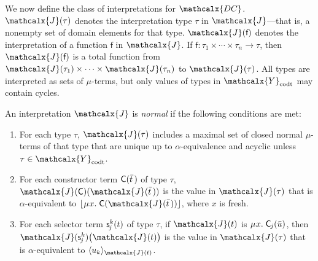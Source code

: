 \documentclass[smallcondensed,draft]{svjour3}
\newcommand\MU{\vvthinspace\mu\vvthinspace}
\newcommand\afterDot{\;} %
\newcommand\const[1]{\textsf{#1}}
\renewcommand{\vec}[1]{\bar #1}
\newcommand{\expand}[2]{\langle \smash{#2} \rangle_{#1}}
\newcommand{\interp}[2]{#1(#2)}
\newcommand{\J}{\mathcalx{J}}
\newcommand{\nf}[1]{\lfloor#1\rfloor}
\newcommand{\aequiv}{\mathrel{=_\alpha}}
\newcommand{\vsim}{\aequiv}
\newcommand{\thD}{\mathcalx{DC}}
\newcommand\Types{\mathcalx{Y}}
\newcommand\Data{\Types_{\mathrm{dt}}}
\newcommand\Codata{\Types_{\mathrm{codt}}}
\newcommand\Nondata{\Types_{\mathrm{ord}}}
\newcommand\vvthinspace{\kern+0.041667em}
\newcommand\negvthinspace{\kern-0.083333em}
\newcommand\negvvthinspace{\kern-0.041667em}
\begin{document}

We now define the class of interpretations for $\thD$.
$\interp{\J}{\tau}$ denotes the interpretation type $\tau$ in $\J$---that is, a
nonempty set of domain elements for that type.
$\interp{\J}{\const{f}}$ denotes the interpretation of a function $\const{f}$ in $\J$.
If $\const{f} : \tau_1 \times \cdots \times \tau_n \to \tau$,
then $\interp{\J}{\const{f}}$ is a total function from $\interp{\J}{\tau_1} \times \cdots \times \interp{\J}{\tau_n}$ to $\interp{\J}{\tau}$.
All types are interpreted as sets of $\mu$-terms, but
only values of types in $\Codata$ may contain cycles.

\begin{definition}
\afterDot%
\label{def:norm-interpretation}%
\rm
An interpretation $\J$ is \emph{normal} if the following conditions are met:
\begin{enumerate}
\item
For each type $\tau$,
$\interp{\J}{\tau}$ includes a maximal set of closed normal $\mu$-terms of that type that are
unique up to $\alpha$-equivalence and acyclic unless $\tau \in \Codata$.\strut

\item
For each constructor term $\vphantom{s^k}\const{C}( \vec t \,)$ of type $\tau$,
$\interp{\J}{\const{C}}( \interp{\J}{\vec t\,} )$ is the value
in $\interp{\J}{\tau}$ that is $\alpha$-equivalent to
$\nf{\MU x.\; \const{C}( \interp{\J}{\vec t\,} )}$, where $x$ is fresh.\strut

\item
For each selector term $\const s^k_{\negvthinspace j}( t )$ of type $\tau$, %
if $\interp{\J}{t}$ is $\MU x.\; \const{C}_{\negvthinspace j}( \vec u )$,
then $\J\negvvthinspace( \const s^k_{\negvthinspace j} )\bigl( \interp{\J}{t} \bigr)$ is the value
in $\interp{\J}{\tau}$ that is $\alpha$-equivalent to
$\expand{\interp{\J}{t}}{u_k}$.
\end{enumerate}
\end{definition}
\end{document}
